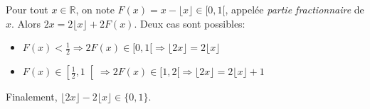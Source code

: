 Pour tout $x\in\mathbb{R}$, on note $F(x)=x-\lfloor x \rfloor \in [0,1[$, appelée \textit{partie fractionnaire} de $x$. Alors $2x=2\lfloor x \rfloor + 2F(x)$. Deux cas sont possibles:
\begin{itemize}
  \item $F(x)<\frac{1}{2}\Rightarrow 2F(x)\in [0,1[ \Rightarrow \lfloor 2x \rfloor = 2\lfloor x \rfloor $
  \item $F(x)\in \left[\frac{1}{2}, 1\right[ \Rightarrow 2F(x)\in [1,2[ \Rightarrow \lfloor 2x \rfloor = 2\lfloor x \rfloor + 1$
\end{itemize}
Finalement, $\lfloor 2x \rfloor - 2\lfloor x \rfloor\in \{0,1\}$. 

